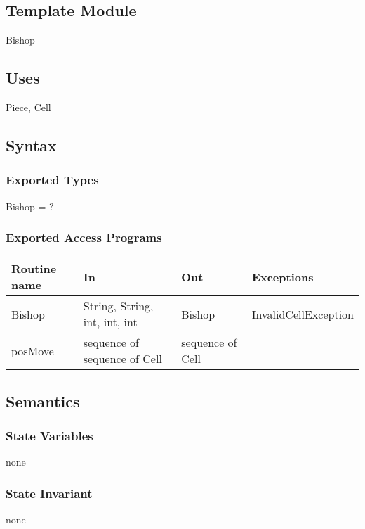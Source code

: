 \documentclass[12pt]{article}
\begin{document}
\subsection*{Template Module}

Bishop

\subsection* {Uses}

Piece, Cell

\subsection* {Syntax}

\subsubsection* {Exported Types}

Bishop = ?

\subsubsection* {Exported Access Programs}

\begin{tabular}{| l | l | l | l |}
\hline
\textbf{Routine name} & \textbf{In} & \textbf{Out} & \textbf{Exceptions}\\
\hline
Bishop &String, String, int, int, int & Bishop & InvalidCellException\\
\hline
posMove & sequence of sequence of Cell & sequence of Cell & ~\\
\hline
\end{tabular}

\subsection* {Semantics}

\subsubsection* {State Variables}

none

\subsubsection* {State Invariant}

none
\end{document}
